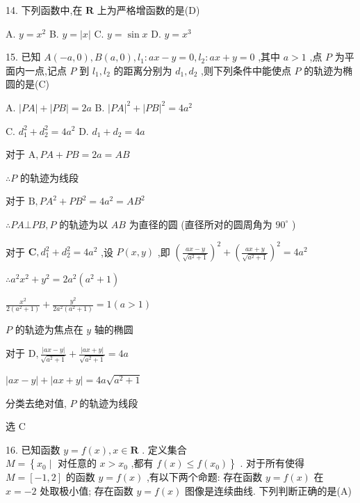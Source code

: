 \documentclass[10pt]{article}
\newcommand*\circled[1]{\tikz[baseline=(char.base)]{\node[shape=circle,draw,inner sep=1.5pt] (char) {\small #1};}}
\begin{document}
14. 下列函数中,在 \(\mathbf{R}\) 上为严格增函数的是(D)

A. \(y = {x}^{2}\) B. \(y = \left| x\right|\) C. \(y = \sin x\) D. \(y = {x}^{3}\)

15. 已知 \(A\left( {-a,0}\right) ,B\left( {a,0}\right) ,{l}_{1} : {ax} - y = 0,{l}_{2} : {ax} + y = 0\) ,其中 \(a > 1\) ,点 \(P\) 为平面内一点,记点 \(P\) 到 \({l}_{1},{l}_{2}\) 的距离分别为 \({d}_{1},{d}_{2}\) ,则下列条件中能使点 \(P\) 的轨迹为椭圆的是(C)

A. \(\left| {PA}\right|  + \left| {PB}\right|  = {2a}\) B. \({\left| PA\right| }^{2} + {\left| PB\right| }^{2} = 4{a}^{2}\)

C. \({d}_{1}^{2} + {d}_{2}^{2} = 4{a}^{2}\) D. \({d}_{1} + {d}_{2} = {4a}\)

对于 \(\mathrm{A},{PA} + {PB} = {2a} = {AB}\)

\(\therefore P\) 的轨迹为线段

对于 \(\mathrm{B},P{A}^{2} + P{B}^{2} = 4{a}^{2} = A{B}^{2}\)

\(\therefore {PA} \bot  {PB},P\) 的轨迹为以 \({AB}\) 为直径的圆 (直径所对的圆周角为 \({90}^{ \circ  }\) )

对于 \(\mathbf{C},{d}_{1}^{2} + {d}_{2}^{2} = 4{a}^{2}\) ,设 \(P\left( {x,y}\right)\) ,即 \({\left( \frac{{ax} - y}{\sqrt{{a}^{2} + 1}}\right) }^{2} + {\left( \frac{{ax} + y}{\sqrt{{a}^{2} + 1}}\right) }^{2} = 4{a}^{2}\)

\(\therefore {a}^{2}{x}^{2} + {y}^{2} = 2{a}^{2}\left( {{a}^{2} + 1}\right)\)

\(\frac{{x}^{2}}{2\left( {{a}^{2} + 1}\right) } + \frac{{y}^{2}}{2{a}^{2}\left( {{a}^{2} + 1}\right) } = 1\left( {a > 1}\right)\)

\(P\) 的轨迹为焦点在 \(y\) 轴的椭圆

对于 \(\mathrm{D},\frac{\left| ax - y\right| }{\sqrt{{a}^{2} + 1}} + \frac{\left| ax + y\right| }{\sqrt{{a}^{2} + 1}} = {4a}\)

\(\left| {{ax} - y}\right|  + \left| {{ax} + y}\right|  = {4a}\sqrt{{a}^{2} + 1}\)

分类去绝对值, \(P\) 的轨迹为线段

选 C

16. 已知函数 \(y = f\left( x\right) ,x \in  \mathbf{R}\) . 定义集合 \(M = \left\{  {{x}_{0} \mid  \text{ 对任意的 }x > {x}_{0}\text{ ,都有 }f\left( x\right)  \leq  f\left( {x}_{0}\right) }\right\}\) . 对于所有使得 \(M = \left\lbrack  {-1,2}\right\rbrack\) 的函数 \(y = f\left( x\right)\) ,有以下两个命题:  \circled{1} 存在函数 \(y = f\left( x\right)\) 在 \(x =  - 2\) 处取极小值;  \circled{2} 存在函数 \(y = f\left( x\right)\) 图像是连续曲线. 下列判断正确的是(A)
\end{document}
